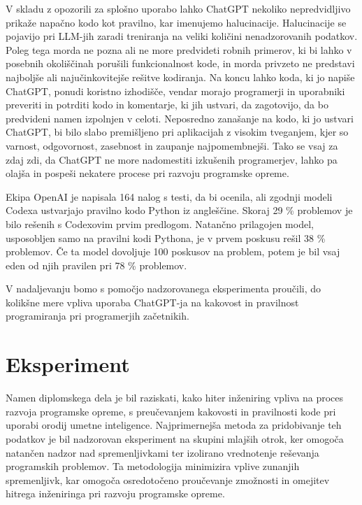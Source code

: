 \documentclass[a4paper,12pt,openright]{book}
\begin{document}
V skladu z opozorili za splošno uporabo lahko ChatGPT nekoliko nepredvidljivo prikaže napačno kodo kot pravilno, kar imenujemo halucinacije. Halucinacije se pojavijo pri LLM-jih zaradi treniranja na veliki količini nenadzorovanih podatkov. \cite{alkaissi2023artificial} \\
Poleg tega morda ne pozna ali ne more predvideti robnih primerov, ki bi lahko v posebnih okoliščinah porušili funkcionalnost kode, in morda privzeto ne predstavi najboljše ali najučinkovitejše rešitve kodiranja. Na koncu lahko koda, ki jo napiše ChatGPT, ponudi koristno izhodišče, vendar morajo programerji in uporabniki preveriti in potrditi kodo in komentarje, ki jih ustvari, da zagotovijo, da bo predvideni namen izpolnjen v celoti. Neposredno zanašanje na kodo, ki jo ustvari ChatGPT, bi bilo slabo premišljeno pri aplikacijah z visokim tveganjem, kjer so varnost, odgovornost, zasebnost in zaupanje najpomembnejši. Tako se vsaj za zdaj zdi, da ChatGPT ne more nadomestiti izkušenih programerjev, lahko pa olajša in pospeši nekatere procese pri razvoju programske opreme.
\cite{Meyer2023}

Ekipa OpenAI je napisala 164 nalog s testi, da bi ocenila, ali
zgodnji modeli Codexa ustvarjajo pravilno kodo Python iz angleščine. Skoraj 29 \% problemov je bilo rešenih s Codexovim prvim predlogom. 
Natančno prilagojen model, usposobljen samo na pravilni kodi Pythona,
je v prvem poskusu rešil 38 \% problemov. Če ta model
dovoljuje 100 poskusov na problem, potem je bil vsaj eden od njih
pravilen pri 78 \% problemov. \cite{DBLP:journals/corr/abs-2107-03374}

V nadaljevanju bomo s pomočjo nadzorovanega eksperimenta proučili, do kolikšne mere vpliva uporaba ChatGPT-ja na kakovost in pravilnost programiranja pri programerjih začetnikih.


\chapter{Eksperiment}

Namen diplomskega dela je bil raziskati, kako hiter inženiring vpliva na proces razvoja programske opreme, s preučevanjem kakovosti in pravilnosti kode pri uporabi orodij umetne inteligence. Najprimernejša metoda za pridobivanje teh podatkov je bil nadzorovan eksperiment na skupini mlajših otrok, ker omogoča natančen nadzor nad spremenljivkami ter izolirano vrednotenje reševanja programskih problemov. Ta metodologija minimizira vplive zunanjih spremenljivk, kar omogoča osredotočeno proučevanje zmožnosti in omejitev hitrega inženiringa pri razvoju programske opreme.
\end{document}
